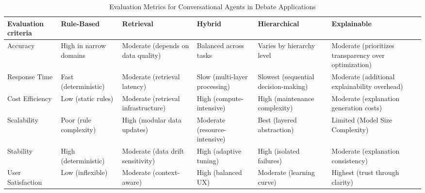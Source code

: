 \documentclass[conference]{IEEEtran}
\begin{document}
\begin{table}[H]
\begin{minipage}{\columnwidth}
\raggedleft
\begin{turn}{90}
    \begin{threeparttable}
    \caption{Evaluation Metrics for Conversational Agents in Debate Applications}
    \label{tab:ai_models}
    \begin{tabularx}{\textheight}{|X|X|X|X|X|X|}
    \hline
    \textbf{Evaluation criteria}  & \textbf{Rule-Based}                 & \textbf{Retrieval}                            & \textbf{Hybrid}             & \textbf{Hierarchical}  \tnote{1}                & \textbf{Explainable}\tnote{2} \tnote{,} \tnote{3} \\ \hline
    Accuracy                      & High in narrow domains \tnote{2}   & Moderate (depends on data quality) \footnotemark[4] & Balanced across tasks                 & Varies by hierarchy level                 & Moderate (prioritizes transparency over optimization) \\ \hline
    Response Time \tnote{1}     & Fast (deterministic)                & Moderate (retrieval latency)                  & Slow (multi-layer processing)         & Slowest (sequential decision-making)      & Moderate (additional explainability overhead) \\ \hline
    Cost Efficiency               & Low (static rules)                  & Moderate (retrieval infrastructure)           & High (compute-intensive)              & High (maintenance complexity)             & Moderate (explanation generation costs) \\ \hline
    Scalability                   & Poor (rule complexity)              & High (modular data updates)                   & Moderate (resource-intensive)         & Best (layered abstraction)                & Limited (Model Size Complexity) \\ \hline
    Stability                     & High (deterministic)                & Moderate (data drift sensitivity)             & High (adaptive tuning)                & High (isolated failures)                  & Moderate (explanation consistency) \\ \hline
    User Satisfaction             & Low (inflexible)                    & Moderate (context-aware)                      & High (balanced UX)                    & Moderate (learning curve)                 & Highest (trust through clarity) \\ \hline
    \end{tabularx}
    \end{threeparttable}
\end{turn}
\end{minipage}
\end{table}
\end{document}
